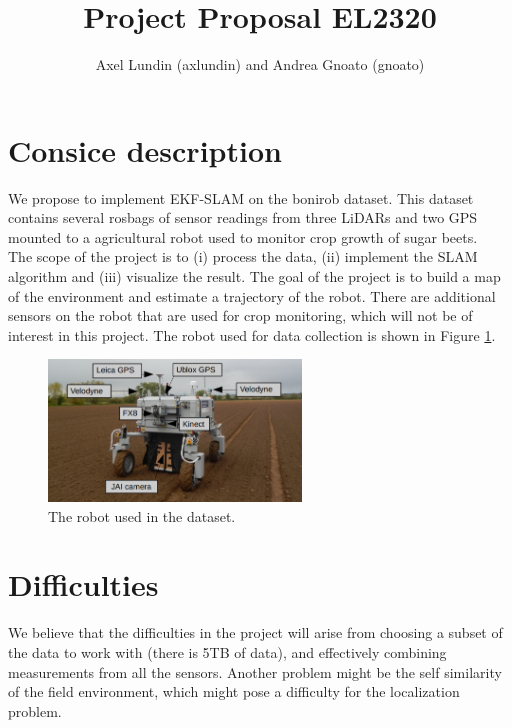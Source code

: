 \documentclass{article}
\title{Project Proposal EL2320}
\author{Axel Lundin (axlundin) and Andrea Gnoato (gnoato)}
\begin{document}
\maketitle

\section*{Consice description}

We propose to implement EKF-SLAM on the bonirob dataset. This dataset contains several rosbags of sensor readings from three LiDARs and two GPS mounted to a agricultural robot used to monitor crop growth of sugar beets. \\ 

The scope of the project is to (i) process the data, (ii) implement the SLAM algorithm and (iii) visualize the result. The goal of the project is to build a map of the environment and estimate a trajectory of the robot. There are additional sensors on the robot that are used for crop monitoring, which will not be of interest in this project. The robot used for data collection is shown in Figure \ref{fig:bonirob_robot}.

\begin{figure}
    \centering
    \includegraphics[width=0.6\textwidth]{bonirob.jpg}
    \caption{The robot used in the dataset.}
    \label{fig:bonirob_robot}
\end{figure}

\section*{Difficulties}

We believe that the difficulties in the project will arise from choosing a subset of the data to work with (there is 5TB of data), and effectively combining measurements from all the sensors. Another problem might be the self similarity of the field environment, which might pose a difficulty for the localization problem. 
\end{document}
